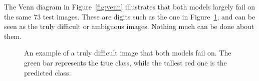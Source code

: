 \documentclass{article}
\begin{document}
The Venn diagram in Figure~\ref{fig:venn} illustrates that both models largely fail on the same 73 test images. These are digits such as the one in Figure~\ref{fig:difficult}, and can be seen as the truly difficult or ambiguous images. Nothing much can be done about them.

\begin{figure}[h!]
\begin{minipage}[c]{.4\hsize}
\centering
{}
\end{minipage} %
\begin{minipage}[c]{.6\hsize}
\centering
{}\par

\end{minipage}
\caption{An example of a truly difficult image that both models fail on. The green bar represents the true class, while the tallest red one is the predicted class.}
\label{fig:difficult}
\end{figure}
\end{document}
